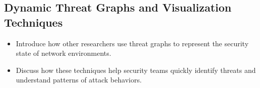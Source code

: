 \subsection{Dynamic Threat Graphs and Visualization Techniques}
\begin{itemize}
    \item Introduce how other researchers use threat graphs to represent the security state of network environments.
    \item Discuss how these techniques help security teams quickly identify threats and understand patterns of attack behaviors.
\end{itemize}
